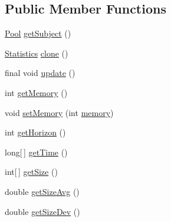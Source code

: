 \subsection*{Public Member Functions}
\begin{DoxyCompactItemize}
\item 
\hyperlink{classjenes_1_1population_1_1_pool_3_01_t_01extends_01_chromosome_01_4_a4bd84795aaada004e3abac72137269fa}{Pool} \hyperlink{classjenes_1_1population_1_1_pool_3_01_t_01extends_01_chromosome_01_4_1_1_statistics_a9db9e7c21c97094a04ed52d315db7482}{get\-Subject} ()
\item 
\hyperlink{classjenes_1_1population_1_1_pool_3_01_t_01extends_01_chromosome_01_4_1_1_statistics_a5a184d091d089a3dc78b3e9973e685d9}{Statistics} \hyperlink{classjenes_1_1population_1_1_pool_3_01_t_01extends_01_chromosome_01_4_1_1_statistics_a89a85c6e91b1f128f1524f2b9b38fc12}{clone} ()
\item 
final void \hyperlink{classjenes_1_1population_1_1_pool_3_01_t_01extends_01_chromosome_01_4_1_1_statistics_afffc47cb3420452d2b98b03ed7fa3d71}{update} ()
\item 
int \hyperlink{classjenes_1_1population_1_1_pool_3_01_t_01extends_01_chromosome_01_4_1_1_statistics_a17757de72cb000576cc2114e75fafd25}{get\-Memory} ()
\item 
void \hyperlink{classjenes_1_1population_1_1_pool_3_01_t_01extends_01_chromosome_01_4_1_1_statistics_aeea0af4c368e403cc19c4eb723c10795}{set\-Memory} (int \hyperlink{classjenes_1_1population_1_1_pool_3_01_t_01extends_01_chromosome_01_4_1_1_statistics_a9f0fedb318a5431e92b67908b927ec63}{memory})
\item 
int \hyperlink{classjenes_1_1population_1_1_pool_3_01_t_01extends_01_chromosome_01_4_1_1_statistics_ac20d31aa14311fd4c8c9ef9e6508f373}{get\-Horizon} ()
\item 
long\mbox{[}$\,$\mbox{]} \hyperlink{classjenes_1_1population_1_1_pool_3_01_t_01extends_01_chromosome_01_4_1_1_statistics_a18bf8daccb7eaa1090581157b4710f18}{get\-Time} ()
\item 
int\mbox{[}$\,$\mbox{]} \hyperlink{classjenes_1_1population_1_1_pool_3_01_t_01extends_01_chromosome_01_4_1_1_statistics_a355b5589c2d45803eeea6b437af05596}{get\-Size} ()
\item 
double \hyperlink{classjenes_1_1population_1_1_pool_3_01_t_01extends_01_chromosome_01_4_1_1_statistics_a05dffe753d53ac3094d0f70fd757a319}{get\-Size\-Avg} ()
\item 
double \hyperlink{classjenes_1_1population_1_1_pool_3_01_t_01extends_01_chromosome_01_4_1_1_statistics_a6c958f6bd661f63c1a7ae3fd8e1c66a2}{get\-Size\-Dev} ()

\end{DoxyCompactItemize}
